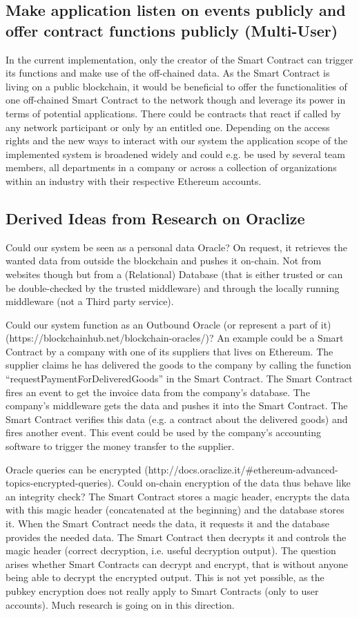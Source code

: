 \subsection{Make application listen on events publicly and offer contract functions publicly (Multi-User)}
In the current implementation, only the creator of the Smart Contract can trigger its functions and make use of the off-chained data. As the Smart Contract is living on a public blockchain, it would be beneficial to offer the functionalities of one off-chained Smart Contract to the network though and leverage its power in terms of potential applications. There could be contracts that react if called by any network participant or only by an entitled one. Depending on the access rights and the new ways to interact with our system the application scope of the implemented system is broadened widely and could e.g. be used by several team members, all departments in a company or across a collection of organizations within an industry with their respective Ethereum accounts.

\subsection{Derived Ideas from Research on Oraclize}
Could our system be seen as a personal data Oracle? On request, it retrieves the wanted data from outside the blockchain and pushes it on-chain. Not from websites though but from a (Relational) Database (that is either trusted or can be double-checked by the trusted middleware) and through the locally running middleware (not a Third party service).

Could our system function as an Outbound Oracle (or represent a part of it) (https://blockchainhub.net/blockchain-oracles/)?
An example could be a Smart Contract by a company with one of its suppliers that lives on Ethereum. The supplier claims he has delivered the goods to the company by calling the function “requestPaymentForDeliveredGoods” in the Smart Contract. The Smart Contract fires an event to get the invoice data from the company’s database. The company’s middleware gets the data and pushes it into the Smart Contract. The Smart Contract verifies this data (e.g. a contract about the delivered goods) and fires another event. This event could be used by the company’s accounting software to trigger the money transfer to the supplier.

Oracle queries can be encrypted (http://docs.oraclize.it/#ethereum-advanced-topics-encrypted-queries). Could on-chain encryption of the data thus behave like an integrity check? The Smart Contract stores a magic header, encrypts the data with this magic header (concatenated at the beginning) and the database stores it.
When the Smart Contract needs the data, it requests it and the database provides the needed data. The Smart Contract then decrypts it and controls the magic header (correct decryption, i.e. useful decryption output).
The question arises whether Smart Contracts can decrypt and encrypt, that is without anyone being able to decrypt the encrypted output. This is not yet possible, as the pubkey encryption does not really apply to Smart Contracts (only to user accounts). Much research is going on in this direction.

